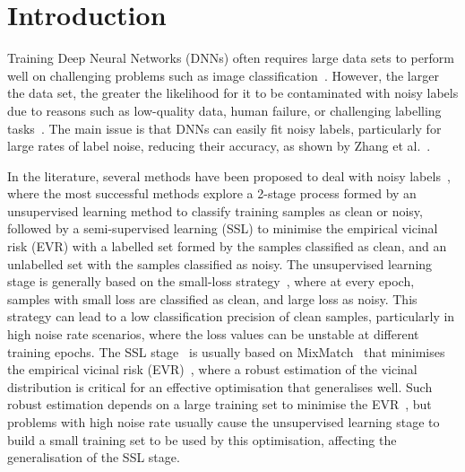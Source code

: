 \documentclass{article}
\begin{document}
\section{Introduction}



Training Deep Neural Networks (DNNs) often requires large data sets to perform well on challenging problems such as image classification~\cite{litjens2017survey}. However, the larger the data set, the greater the likelihood for it to be contaminated with noisy labels due to reasons such as low-quality data, human failure, or challenging labelling tasks~\cite{frenay_survey}. The main issue is that DNNs can easily fit noisy labels, particularly for large rates of label noise, reducing their accuracy, as shown by Zhang et al.~\cite{zhang2016understanding}.


In the literature, several methods have been proposed to deal with noisy labels~\cite{kim2019nlnl, wang2019symmetric, ren2018learning,wang2019symmetric,nguyen2019self,li2020dividemix}, where the most successful methods explore a 2-stage process formed by an unsupervised learning method to classify training samples as clean or noisy, followed by a semi-supervised learning (SSL) to minimise the empirical vicinal risk (EVR) with a labelled set formed by the samples classified as clean, and an unlabelled set with the samples classified as noisy.
The unsupervised learning stage is generally based on the small-loss strategy~\cite{yu2019does}, where at every epoch, samples with small loss are classified as clean, and large loss as noisy. 
This strategy can lead to a low classification precision of clean samples, particularly in high noise rate scenarios, where the loss values can be unstable at different training epochs. The SSL stage~\cite{arazo2019unsupervised, nguyen2019self,li2020dividemix} is usually based on MixMatch~\cite{berthelot2019mixmatch} that minimises the empirical vicinal risk (EVR)~\cite{zhang2017mixup}, where a robust estimation of the vicinal distribution is critical for an effective optimisation that generalises well. 
Such robust estimation depends on a large training set to minimise the EVR~\cite{berthelot2019mixmatch,zhang2018generalization}, but problems with high noise rate usually cause the unsupervised learning stage to build a small training set to be used by this optimisation, affecting the generalisation of the SSL stage.
\end{document}
